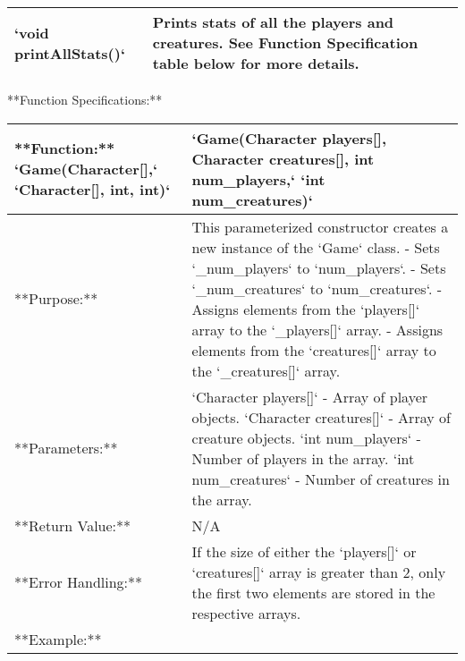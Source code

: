 {{{{{{{{{{{\begin{longtable}{|p{2.0in}|p{4.0in}|}
`void printAllStats()` & Prints stats of all the players and creatures. See Function Specification table below for more details. \\ \hline

\end{longtable}












**Function Specifications:**

\renewcommand{\arraystretch}{1.5}
\begin{longtable}{|p{1.7in}|p{4.3in}|}
\hline
**Function:** `Game(Character[],` \newline `Character[], int, int)` & `Game(Character players[], Character creatures[], int num_players,` `int num_creatures)` \\ \hline

**Purpose:** & This parameterized constructor creates a new instance of the `Game` class. \newline
- Sets `_num_players` to `num_players`. \newline
- Sets `_num_creatures` to `num_creatures`. \newline
- Assigns elements from the `players[]` array to the `_players[]` array. \newline
- Assigns elements from the `creatures[]` array to the `_creatures[]` array. \\ \hline

**Parameters:** & 
`Character players[]` - Array of player objects. \newline
`Character creatures[]` - Array of creature objects. \newline
`int num_players` - Number of players in the array. \newline
`int num_creatures` - Number of creatures in the array. \\ \hline

**Return Value:** & N/A \\ \hline

**Error Handling:** & 
If the size of either the `players[]` or `creatures[]` array is greater than 2, only the first two elements are stored in the respective arrays. \\ \hline

**Example:** & 

\begin{example}


\end{example}
\end{longtable}}}}}}}}}}}}
